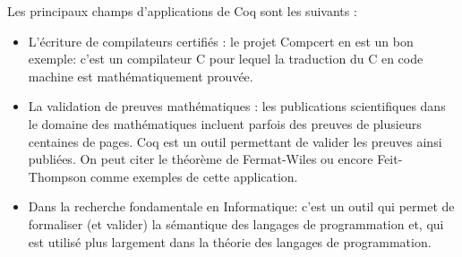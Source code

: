 \documentclass[a4paper, 11pt]{report}
\begin{document}
      Les principaux champs d'applications de Coq sont les suivants :
      \begin{itemize}
        \item L'écriture de compilateurs certifiés : le projet Compcert en
          est un bon exemple: c'est un compilateur C pour lequel la traduction
          du C en code machine est mathématiquement prouvée.
        \item La validation de preuves mathématiques : les publications
          scientifiques dans le domaine des mathématiques incluent parfois
          des preuves de plusieurs centaines de pages. Coq est un outil
          permettant de valider les preuves ainsi publiées. On peut citer
          le théorème de Fermat-Wiles ou encore Feit-Thompson comme exemples
          de cette application.
        \item Dans la recherche fondamentale en Informatique: c'est un outil
          qui permet de formaliser (et valider) la sémantique des langages de
          programmation et, qui est utilisé plus largement dans la théorie
          des langages de programmation.
      \end{itemize}
\end{document}
